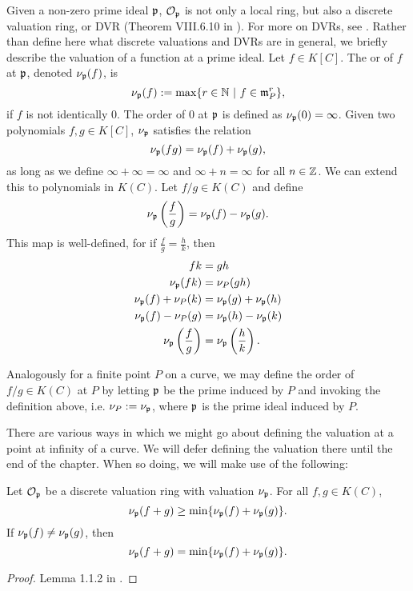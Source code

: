 Given a non-zero prime ideal $\frak p$, $\cal O_{\frak p}$ is not only a local ring,
but also a discrete valuation ring, or DVR (Theorem VIII.6.10 in \cite{hungerford}).
For more on DVRs, see \cite{eisenbud95}.
Rather than define here what discrete valuations and DVRs are in general,
we briefly describe the valuation of a function at a prime ideal.
Let $f \in K[C]$.
The  or  of $f$ at $\frak p$, denoted $\nu_{\frak p}(f)$, is
\[ \nu_{\frak p}(f) := \max\{ r \in \bb N ~|~ f \in \frak m_P^r \}, \]
if $f$ is not identically 0.
The order of 0 at $\frak p$ is defined as $\nu_{\frak p}(0) = \infty$.
Given two polynomials $f, g \in K[C]$, $\nu_{\frak p}$ satisfies the relation
\[ \nu_{\frak p}(fg) = \nu_{\frak p}(f) + \nu_{\frak p}(g), \]
as long as we define $\infty + \infty = \infty$ and $\infty + n = \infty$ for all $n \in \bb Z$.
We can extend this to polynomials in $K(C)$.
Let $f/g \in K(C)$ and define
\[ \nu_{\frak p}\left(\frac f g\right) = \nu_{\frak p}(f) - \nu_{\frak p}(g). \]
This map is well-defined,
for if $\frac f g = \frac h k$, then
\begin{align*}
  fk &= gh \\
  \nu_{\frak p}(fk) &= \nu_P(gh) \\
  \nu_{\frak p}(f) + \nu_P(k) &= \nu_{\frak p}(g) + \nu_{\frak p}(h) \\
  \nu_{\frak p}(f) - \nu_P(g) &= \nu_{\frak p}(h) - \nu_{\frak p}(k) \\
  \nu_{\frak p}\left(\frac f g\right) &= \nu_{\frak p}\left(\frac h k\right).
\end{align*}

Analogously for a finite point $P$ on a curve,
we may define the order of $f/g \in K(C)$ at $P$
by letting $\frak p$ be the prime induced by $P$ and invoking the definition above,
i.e. $\nu_P := \nu_{\frak p}$, where $\frak p$ is the prime ideal induced by $P$.

There are various ways in which we might go about defining the valuation at a point at infinity of a curve.
We will defer defining the valuation there until the end of the chapter.
When so doing, we will make use of the following:
\begin{proposition}
  \label{prop_valuation_min}
  Let $\cal O_{\frak p}$ be a discrete valuation ring with valuation $\nu_{\frak p}$.
  For all $f, g \in K(C)$,
  \[ \nu_{\frak p}(f + g) \geq \min\{ \nu_{\frak p}(f) + \nu_{\frak p}(g) \}. \]
  If $\nu_{\frak p}(f) \neq \nu_{\frak p}(g)$, then
  \[ \nu_{\frak p}(f + g) = \min\{ \nu_{\frak p}(f) + \nu_{\frak p}(g) \}. \]
\end{proposition}
\begin{proof}
  Lemma 1.1.2 in \cite{goldschmidt03}.
\end{proof}

